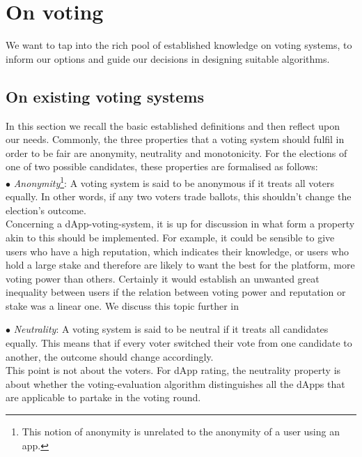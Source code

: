 
\section{On voting}
We want to tap into the rich pool of established knowledge on  voting systems, to inform our options and guide our decisions in designing suitable algorithms. 

\subsection{On existing voting systems}
In this section we recall the basic established definitions and then reflect upon our needs.
Commonly, the three properties that a voting system should fulfil in order to be fair are anonymity, neutrality and monotonicity. For the elections of one of two possible candidates, these properties are formalised as follows: \\

$\bullet$ {\emph{Anonymity}\footnote{This notion of anonymity is unrelated to the anonymity of a user using an app.}}:
A voting system is said to be anonymous if it treats all voters equally. In other words, if any two voters trade ballots, this shouldn't change the election's outcome. \\
Concerning a dApp-voting-system, it is up for discussion in what form a property akin to this should be implemented. For example, it could be sensible to give users who have a high reputation, which indicates their knowledge, or users who hold a large stake and therefore are likely to want the best for the platform, more voting power than others. Certainly it would establish an unwanted great inequality between users if the relation between voting power and reputation or stake was a linear one. We discuss this topic further in 

$\bullet$ {\emph{Neutrality}}: A voting system is said to be neutral if it treats all candidates equally. This means that if every voter switched their vote from one candidate to another, the outcome should change accordingly. \\
This point is not about the voters. For dApp rating, the neutrality property is about whether the voting-evaluation algorithm distinguishes all the dApps that are applicable to partake in the voting round. 

